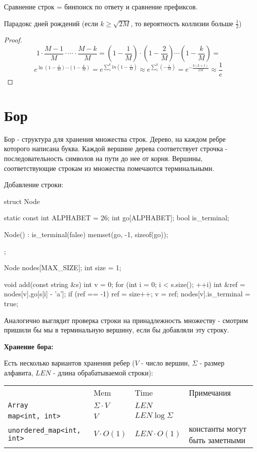 Сравнение строк = бинпоиск по ответу и сравнение префиксов. 

Парадокс дней рождений (если $k \ge \sqrt{2M}$, то вероятность коллизии больше $\frac12$)
\begin{proof}
$$1 \cdot \frac{M - 1}{M} \cdot \cdots \cdot \frac{M - k}{M} = \left( 1 - \frac{1}{M} \right) \cdot \left( 1 - \frac{2}{M} \right) \cdots \left( 1 - \frac{k}{M} \right) = $$
$$e^{\ln (1 - \frac{1}{M}) \cdots (1 - \frac{k}{M})} = e^{\sum_1^k ln(1 - \frac{i}{M})} \approx e^{\sum_1^k(- \frac{i}{M})} = e^{-\frac{k(k + 1)}{2M}} \approx \frac{1}{e}$$
\end{proof} 

\section{Бор}

\begin{Def}
Бор - структура для хранения множества строк. Дерево, на каждом ребре которого написана буква. Каждой вершине дерева соответствует строчка - последовательность символов на пути до нее от корня. Вершины, соответствующие строкам из множества помечаются терминальными. 
\end{Def}


Добавление строки:

\begin{cppcode}
struct Node {
    static const int ALPHABET = 26;
    int go[ALPHABET];
    bool is_terminal;
    
    Node() : is_terminal(false) {
        memset(go, -1, sizeof(go));
    }
};

Node nodes[MAX_SIZE];
int size = 1;

void add(const string &s) {
    int v = 0;
    for (int i = 0; i < s.size(); ++i) {
        int &ref = nodes[v].go[s[i] - 'a'];
        if (ref == -1)
            ref = size++;
        v = ref; 	
    }
    nodes[v].is_terminal = true;
}
\end{cppcode}

Аналогично выглядит проверка строки на принадлежность множеству - смотрим пришили бы мы в терминальную вершину, если бы добавляли эту строку.

\textbf{Хранение бора:}

Есть несколько вариантов хранения ребер ($V$ - число вершин, $\Sigma$ - размер алфавита, $LEN$ - длина обрабатываемой строки):

\begin{tabular}[c]{llll}
& Mem & Time & Примечания \\
\texttt{Array} & $\Sigma \cdot V$ & $LEN$ &  \\
\texttt{map<int, int>} & $V$ & $LEN \log \Sigma$ & \\
\texttt{unordered\_map<int, int>} & $V \cdot O(1)$ & $LEN \cdot O(1)$ & константы могут быть заметными \\
\end{tabular}


